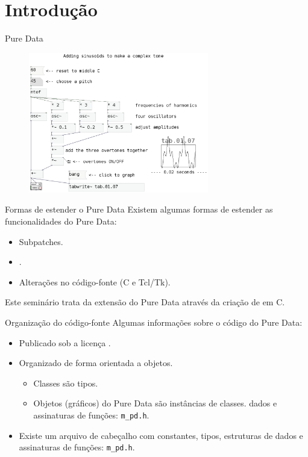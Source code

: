 \section{Introdução}

\begin{frame}{Pure Data}
\begin{figure}
\centering
\includegraphics[width=0.7\textwidth]{../images/pd-facil}
\end{figure}
\end{frame}


\begin{frame}{Formas de estender o Pure Data}
Existem algumas formas de estender as funcionalidades do Pure Data:
\begin{itemize}
\item Subpatches.
\item {}.
\item Alterações no código-fonte (C e Tcl/Tk).
\end{itemize}
\pause
\vspace{1em}
Este seminário trata da extensão do Pure Data através da criação de
\externals em C.
\end{frame}


\begin{frame}[fragile]{Organização do código-fonte}
Algumas informações sobre o código do Pure Data:
\begin{itemize}
\item Publicado sob a licença .
\item Organizado de forma orientada a objetos.
\begin{itemize}
\item Classes são tipos.
\item Objetos (gráficos) do Pure Data são instâncias de classes.
dados e assinaturas de funções: \texttt{m\_pd.h}.
\end{itemize}
\item Existe um arquivo de cabeçalho com constantes, tipos, estruturas de
dados e assinaturas de funções: \texttt{m\_pd.h}.
\end{itemize}
\end{frame}


